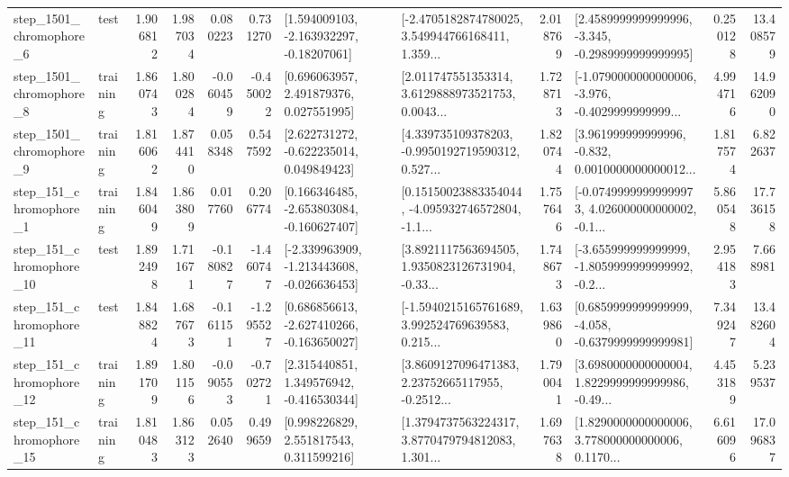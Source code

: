 \begin{tabular}{llrrrrllrlrr}
  step\_1501\_chromophore\_6 &      test &      1.906812 &    1.987034 &      0.080223 &  0.731270 &    [1.594009103, -2.163932297, -0.18207061] &  [-2.4705182874780025, 3.549944766168411, 1.359... &       2.018769 &  [2.4589999999999996, -3.345, -0.2989999999999995] &            0.250128 &         13.408579 \\
  step\_1501\_chromophore\_8 &  training &      1.860743 &    1.800284 &     -0.060459 & -0.450022 &     [0.696063957, 2.491879376, 0.027551995] &  [2.011747551353314, 3.6129888973521753, 0.0043... &       1.728713 &  [-1.0790000000000006, -3.976, -0.4029999999999... &            4.994716 &         14.962090 \\
  step\_1501\_chromophore\_9 &  training &      1.816062 &    1.874410 &      0.058348 &  0.547592 &    [2.622731272, -0.622235014, 0.049849423] &  [4.339735109378203, -0.9950192719590312, 0.527... &       1.820744 &  [3.961999999999996, -0.832, 0.0010000000000012... &            1.817574 &          6.822637 \\
   step\_151\_chromophore\_1 &  training &      1.846049 &    1.863809 &      0.017760 &  0.206774 &   [0.166346485, -2.653803084, -0.160627407] &  [0.15150023883354044, -4.095932746572804, -1.1... &       1.757646 &  [-0.07499999999999973, 4.026000000000002, -0.1... &            5.860548 &         17.736158 \\
  step\_151\_chromophore\_10 &      test &      1.892498 &    1.711671 &     -0.180827 & -1.460747 &  [-2.339963909, -1.213443608, -0.026636453] &  [3.8921117563694505, 1.9350823126731904, -0.33... &       1.748673 &  [-3.655999999999999, -1.8059999999999992, -0.2... &            2.954183 &          7.668981 \\
  step\_151\_chromophore\_11 &      test &      1.848824 &    1.687673 &     -0.161151 & -1.295527 &   [0.686856613, -2.627410266, -0.163650027] &  [-1.5940215165761689, 3.992524769639583, 0.215... &       1.639860 &  [0.6859999999999999, -4.058, -0.6379999999999981] &            7.349247 &         13.482604 \\
  step\_151\_chromophore\_12 &  training &      1.891709 &    1.801156 &     -0.090553 & -0.702721 &    [2.315440851, 1.349576942, -0.416530344] &  [3.8609127096471383, 2.23752665117955, -0.2512... &       1.790041 &  [3.6980000000000004, 1.8229999999999986, -0.49... &            4.453189 &          5.239537 \\
  step\_151\_chromophore\_15 &  training &      1.810483 &    1.863123 &      0.052640 &  0.499659 &     [0.998226829, 2.551817543, 0.311599216] &  [1.3794737563224317, 3.8770479794812083, 1.301... &       1.697638 &  [1.8290000000000006, 3.778000000000006, 0.1170... &            6.616096 &         17.096837 \\

\end{tabular}
